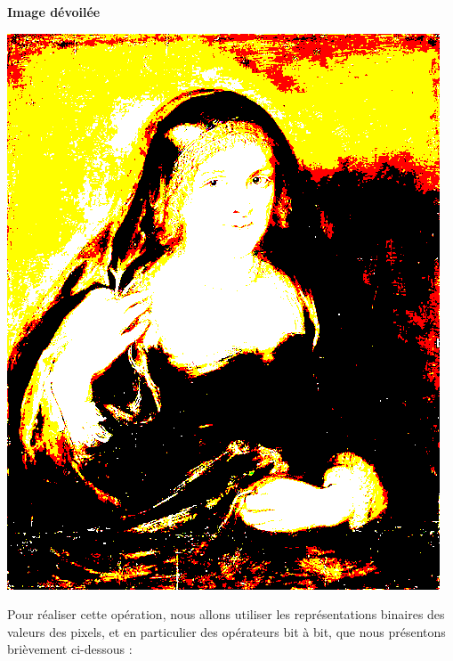 \documentclass[a4paper, french, 12pt]{article}  %
\begin{document}
\begin{minipage}{0.3\linewidth}
\begin{center}
\textbf{Image dévoilée}

\includegraphics[scale=0.4]{images/femme-devoile.png}
\end{center}
\end{minipage}

Pour réaliser cette opération, nous allons utiliser les représentations binaires des valeurs des pixels, et en particulier des opérateurs bit à bit, que nous présentons brièvement ci-dessous :   
\end{document}
